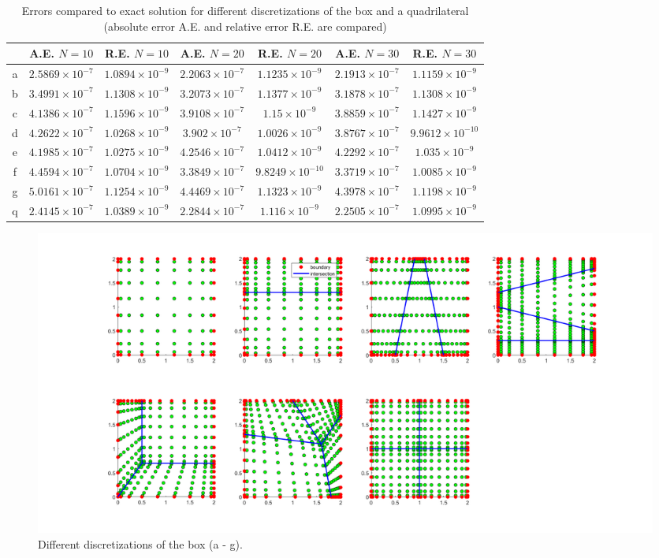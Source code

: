 \documentclass[11pt, a4paper]{article}
\theoremstyle{definition}
\begin{document}
\begin{table}
	\caption{Errors compared to exact solution for different discretizations of the box and a quadrilateral (absolute error A.E. and relative error R.E. are compared)}
	\begin{tabular}{ ||c| c| c| c| c |c|c|| }
		\hline
		\hline
		& A.E. $N =10$ & R.E. $N =10$ &A.E. $N =20$ & R.E. $N =20$ &A.E. $N =30$ & R.E. $N =30$ \\ 
		\hline
		a & $2.5869 \times 10^{-7}$ & $1.0894 \times 10^{-9}$ & $2.2063 \times 10^{-7}$ & $1.1235 \times 10^{-9}$ & $2.1913 \times 10^{-7}$ & $1.1159 \times 10^{-9}$ \\  
		b & $3.4991\times 10^{-7}$ & $1.1308 \times 10^{-9}$ &  $3.2073 \times 10^{-7}$ & $1.1377 \times 10^{-9}$  & $3.1878 \times 10^{-7}$ & $1.1308 \times 10^{-9}$\\  
		c & $4.1386\times 10^{-7}$  & $1.1596 \times 10^{-9}$ & $3.9108\times 10^{-7}$ & $1.15 \times 10^{-9}$  & $3.8859\times 10^{-7}$ & $1.1427\times 10^{-9}$ \\  
		d & $4.2622\times 10^{-7}$ & $1.0268 \times 10^{-9} $& $3.902\times 10^{-7}$ & $1.0026 \times 10^{-9}$ & $3.8767\times 10^{-7}$ & $9.9612 \times 10^{-10}$\\
		e & $4.1985 \times 10^{-7}$ & $1.0275 \times 10^{-9}$  & $4.2546 \times 10^{-7}$ & $1.0412 \times 10^{-9}$  & $4.2292 \times 10^{-7}$  & $1.035 \times 10^{-9}$ \\
		f & $4.4594 \times 10^{-7}$  & $1.0704 \times 10^{-9}$ & $3.3849 \times 10^{-7}$ & $9.8249 \times 10^{-10}$&  $3.3719 \times 10^{-7}$&  $1.0085 \times 10^{-9}$\\
		g & $5.0161\times 10^{-7}$ & $1.1254 \times 10^{-9}$  & $4.4469\times 10^{-7}$& $1.1323 \times 10^{-9}$ &  $4.3978\times 10^{-7}$& $1.1198\times 10^{-9}$\\
		q & $2.4145\times 10^{-7}$ & $1.0389\times 10^{-9}$ & $2.2844\times 10^{-7}$ & $1.116\times 10^{-9}$ & $2.2505\times 10^{-7}$ & $1.0995\times 10^{-9}$\\
		\hline
		\hline
	\end{tabular}
	\label{Tab1:Errors}
\end{table}
	\begin{figure}[h]
		\centering
		\includegraphics[scale=0.35]{BoxSections.png}
		\caption{Different discretizations of the box (a - g).} 
		\label{F2}
	\end{figure}
\end{document}

